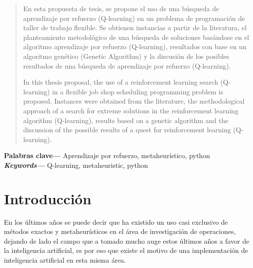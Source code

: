 \documentclass[letterpaper, 10 pt]{article}
\newcommand{\fjsp}{problema de programación de taller de trabajo flexible}
\providecommand{\keywords}[1]
{
	\small	
	\textbf{\textit{Keywords---}} #1
}
\begin{document}
\newpage 
\begin{abstract}
	En esta propuesta de tesis, se propone el uso de una búsqueda de aprendizaje por refuerzo (Q-learning) en un problema de programación de taller de trabajo flexible. Se obtienen instancias a partir de la literatura, el planteamiento metodológico de una búsqueda de soluciones basándose en el algoritmo aprendizaje por refuerzo (Q-learning), resultados con base en un algoritmo genético (Genetic Algorithm) y la discusión de los posibles resultados de una búsqueda de aprendizaje por refuerzo (Q-learning). 
	
	In this thesis proposal, the use of a reinforcement learning search (Q-learning) in a flexible job shop scheduling programming problem is proposed. Instances were obtained from the literature, the methodological approach of a search for extreme solutions in the reinforcement learning algorithm (Q-learning), results based on a genetic algorithm and the discussion of the possible results of a quest for reinforcement learning (Q-learning).
		
\end{abstract}

{{\small } \bfseries Palabras clave---} Aprendizaje por refuerzo, metaheurístico, python \\
\keywords{Q-learning, metaheuristic, python}

%

\section{Introducción}
En los últimos años se puede decir que ha existido un uso casi exclusivo de métodos exactos y metaheurísticos en el área de investigación de operaciones, dejando de lado el campo que a tomado mucho auge estos últimos años a favor de la inteligencia artificial, es por eso que existe el motivo de una implementación de inteligencia artificial en esta misma área.
\end{document}
